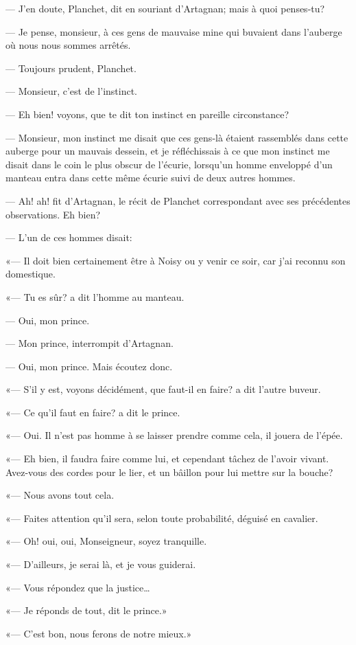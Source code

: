 — J'en doute, Planchet, dit en souriant d'Artagnan; mais à quoi penses-tu?

— Je pense, monsieur, à ces gens de mauvaise mine qui buvaient dans l'auberge où nous nous sommes arrêtés.

— Toujours prudent, Planchet.

— Monsieur, c'est de l'instinct.

— Eh bien! voyons, que te dit ton instinct en pareille circonstance?

— Monsieur, mon instinct me disait que ces gens-là étaient rassemblés dans cette auberge pour un mauvais dessein, et je réfléchissais à ce que mon instinct me disait dans le coin le plus obscur de l'écurie, lorsqu'un homme enveloppé d'un manteau entra dans cette même écurie suivi de deux autres hommes.

— Ah! ah! fit d'Artagnan, le récit de Planchet correspondant avec ses précédentes observations. Eh bien?

— L'un de ces hommes disait:

«— Il doit bien certainement être à Noisy ou y venir ce soir, car j'ai reconnu son domestique.

«— Tu es sûr? a dit l'homme au manteau.

— Oui, mon prince.

— Mon prince, interrompit d'Artagnan.

— Oui, mon prince. Mais écoutez donc.

«— S'il y est, voyons décidément, que faut-il en faire? a dit l'autre buveur.

«— Ce qu'il faut en faire? a dit le prince.

«— Oui. Il n'est pas homme à se laisser prendre comme cela, il jouera de l'épée.

«— Eh bien, il faudra faire comme lui, et cependant tâchez de l'avoir vivant. Avez-vous des cordes pour le lier, et un bâillon pour lui mettre sur la bouche?

«— Nous avons tout cela.

«— Faites attention qu'il sera, selon toute probabilité, déguisé en cavalier.

«— Oh! oui, oui, Monseigneur, soyez tranquille.

«— D'ailleurs, je serai là, et je vous guiderai.

«— Vous répondez que la justice\dots

«— Je réponds de tout, dit le prince.»

«— C'est bon, nous ferons de notre mieux.»

